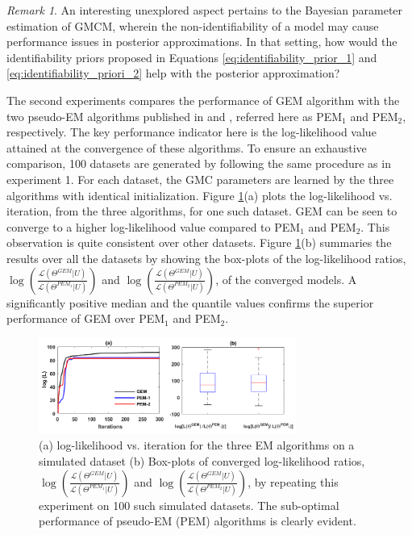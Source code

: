 \documentclass{article}
\theoremstyle{plain}
\theoremstyle{definition}
\theoremstyle{remark}
\newtheorem{remark}[theorem]{Remark}
\begin{document}
\begin{remark}
An interesting unexplored aspect pertains to the Bayesian parameter estimation of GMCM, wherein the non-identifiability of a model may cause performance issues in posterior approximations. In that setting, how would the identifiability priors proposed in Equations \eqref{eq:identifiability_prior_1} and \eqref{eq:identifiability_priori_2} help with the posterior approximation?
\end{remark}
The second experiments compares the performance of GEM algorithm with the two pseudo-EM algorithms published in \citet{Bhattacharya2014} and \citet{Tewari2011}, referred here as PEM$_1$ and PEM$_2$, respectively. The key performance indicator here is the log-likelihood value attained at the convergence of these algorithms. To ensure an exhaustive comparison, 100 datasets are generated by following the same procedure as in experiment 1. For each dataset, the GMC parameters are learned by the three algorithms with identical initialization. Figure \ref{fig:EM_algo_comp}(a) plots the log-likelihood vs. iteration, from the three algorithms, for one such dataset. GEM can be seen to converge to a higher log-likelihood value compared to PEM$_1$ and PEM$_2$. This observation is quite consistent over other datasets. Figure \ref{fig:EM_algo_comp}(b) summaries the results over all the datasets by showing the box-plots of the log-likelihood ratios, $\log\left( \frac{\mathcal{L}\left(\Theta^{GEM}|U\right)}{\mathcal{L}\left(\Theta^{PEM_1}|U\right)}\right)$ and $\log\left( \frac{\mathcal{L}\left(\Theta^{GEM}|U\right)}{\mathcal{L}\left(\Theta^{PEM_2}|U\right)}\right)$, of the converged models. A significantly positive median and the quantile values confirms the superior performance of GEM over PEM$_1$ and PEM$_2$.

\begin{figure}[ht]
\includegraphics[width= 240pt,keepaspectratio=true]{figures/EM_algo_comparisons}
\caption{(a) log-likelihood vs. iteration for the three EM algorithms on a simulated dataset (b) Box-plots of converged log-likelihood ratios,  $\log\left( \frac{\mathcal{L}\left(\Theta^{GEM}|U\right)}{\mathcal{L}\left(\Theta^{PEM_1}|U\right)}\right)$ and $\log\left( \frac{\mathcal{L}\left(\Theta^{GEM}|U\right)}{\mathcal{L}\left(\Theta^{PEM_2}|U\right)}\right)$, by repeating this experiment on 100 such simulated datasets. The sub-optimal performance of pseudo-EM (PEM) algorithms is clearly evident.}
\label{fig:EM_algo_comp}
\end{figure}  
\end{document}
